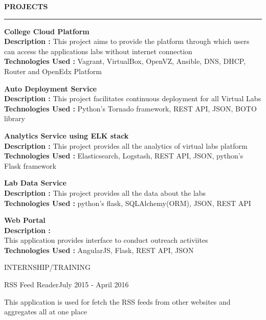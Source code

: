 \documentclass{resume} %
\begin{document}

\textbf{PROJECTS}
\sectionlineskip
\hrule
\textbf{College Cloud Platform} \\
\textbf{Description :} This project aims to provide the platform through which users can access the
applications labs without internet connection \\
\textbf{Technologies Used :} Vagrant, VirtualBox, OpenVZ, Ansible, DNS, DHCP,
Router and OpenEdx Platform

\bigskip

\textbf{Auto Deployment Service} \\
\textbf{Description :} This project facilitates continuous deployment for all Virtual Labs \\
\textbf{Technologies Used :} Python's Tornado framework, REST API, JSON, BOTO library

\bigskip

\textbf{Analytics Service using ELK stack} \\
\textbf{Description :} This project provides all the analytics of virtual labs platform \\
\textbf{Technologies Used :} Elasticsearch, Logstash, REST API, JSON, python's Flask framework

\bigskip

\textbf{Lab Data Service} \\
\textbf{Description :} This project provides all the data about the labs \\
\textbf{Technologies Used :} python's flask, SQLAlchemy(ORM), JSON, REST API

\bigskip
\textbf{Web Portal} \\
\textbf{Description :} \\
This application provides interface to conduct outreach activiites \\
\textbf{Technologies Used :} AngularJS, Flask, REST API, JSON


\break
\begin{rSection}{INTERNSHIP/TRAINING}

  \begin{rSubsection}
    {RSS Feed Reader}{July 2015 - April 2016}{}{}
  \item This application is used for fetch the RSS feeds from other websites
    and aggregates all at one place
 
  \end{rSubsection} 

\end{rSection} 
\end{document}
